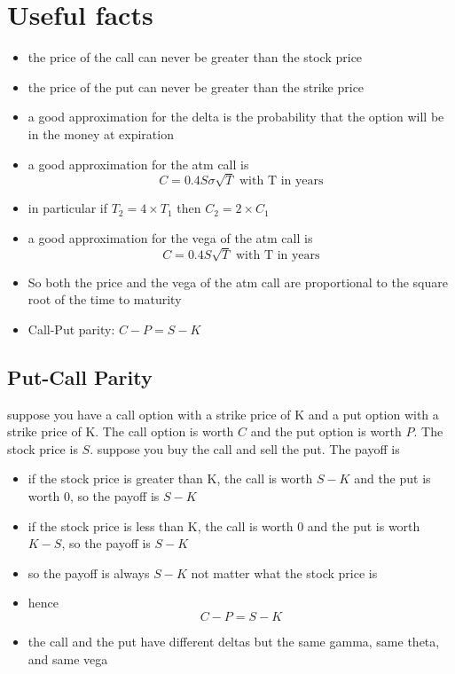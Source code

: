 \documentclass[12pt]{article}
\begin{document}
\section*{Useful facts}
\begin{itemize}
\item the price of the call can never be greater than the stock price
\item the price of the put can never be greater than the strike price
\item a good approximation for the delta is the probability that the option will be in the money at expiration
\item a good approximation for the atm call is
\[C=0.4S\sigma\sqrt{T} \text{ with T in years}\]
\item in particular if $T_2=4\times T_1$ then $C_2=2\times C_1$
\item a good approximation for the vega of the atm call is
\[C=0.4S\sqrt{T} \text{ with T in years}\]
\item So both the price and the vega of the atm call are proportional to the square root of the time to maturity
\item Call-Put parity: $C-P=S-K$
\end{itemize}

\subsection*{Put-Call Parity}
suppose you have a call option with a strike price of K and a put option with a strike price of K. The call option is worth $C$ and the put option is worth $P$. The stock price is $S$.
suppose you buy the call and sell the put. The payoff is
\begin{itemize}
\item if the stock price is greater than K, the call is worth $S-K$ and the put is worth 0, so the payoff is $S-K$
\item if the stock price is less than K, the call is worth 0 and the put is worth $K-S$, so the payoff is $S-K$
\item so the payoff is always $S-K$ not matter what the stock price is
\item hence
\[C-P=S-K\]
\item the call and the put have different deltas but the same gamma, same theta, and same vega
\end{itemize}
\end{document}
